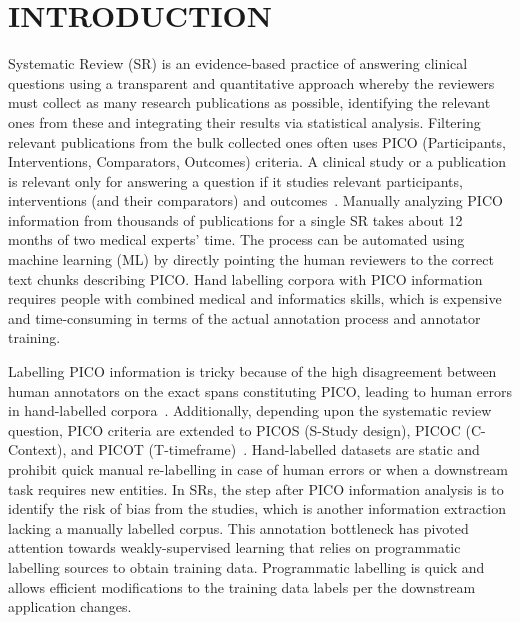 \documentclass[10.7pt,]{article}
\begin{document}
\section{INTRODUCTION}\label{introduction}
%
Systematic Review (SR) is an evidence-based practice of answering clinical questions using a transparent and quantitative approach whereby the reviewers must collect as many research publications as possible, identifying the relevant ones from these and integrating their results via statistical analysis.
Filtering relevant publications from the bulk collected ones often uses PICO (Participants, Interventions, Comparators, Outcomes) criteria. 
A clinical study or a publication is relevant only for answering a question if it studies relevant participants, interventions (and their comparators) and outcomes~\cite{uman2011systematic}. 
Manually analyzing PICO information from thousands of publications for a single SR takes about 12 months of two medical experts' time.
The process can be automated using machine learning (ML) by directly pointing the human reviewers to the correct text chunks describing PICO.
Hand labelling corpora with PICO information requires people with combined medical and informatics skills, which is expensive and time-consuming in terms of the actual annotation process and annotator training.


Labelling PICO information is tricky because of the high disagreement between human annotators on the exact spans constituting PICO, leading to human errors in hand-labelled corpora~\cite{brockmeier2019improving}.
Additionally, depending upon the systematic review question, PICO criteria are extended to PICOS (S-Study design), PICOC (C-Context), and PICOT (T-timeframe)~\cite{riva2012your,methley2014pico,uman2011systematic}.
Hand-labelled datasets are static and prohibit quick manual re-labelling in case of human errors or when a downstream task requires new entities.
In SRs, the step after PICO information analysis is to identify the risk of bias from the studies, which is another information extraction lacking a manually labelled corpus. 
This annotation bottleneck has pivoted attention towards weakly-supervised learning that relies on programmatic labelling sources to obtain training data.
Programmatic labelling is quick and allows efficient modifications to the training data labels per the downstream application changes.
\end{document}
